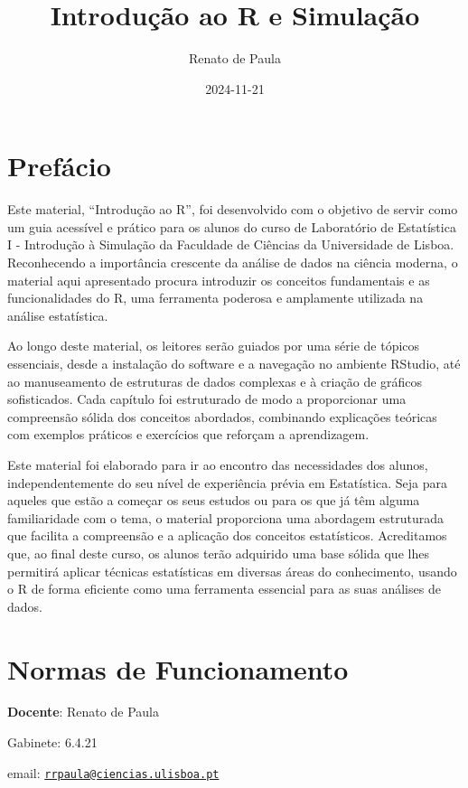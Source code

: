 \documentclass[
]{book}
\title{Introdução ao R e Simulação}
\author{Renato de Paula}
\date{2024-11-21}
\begin{document}
\maketitle

{
\setcounter{tocdepth}{1}
\tableofcontents
}
\chapter{Prefácio}\label{prefuxe1cio}

Este material, ``Introdução ao R'', foi desenvolvido com o objetivo de servir como um guia acessível e prático para os alunos do curso de Laboratório de Estatística I - Introdução à Simulação da Faculdade de Ciências da Universidade de Lisboa. Reconhecendo a importância crescente da análise de dados na ciência moderna, o material aqui apresentado procura introduzir os conceitos fundamentais e as funcionalidades do R, uma ferramenta poderosa e amplamente utilizada na análise estatística.

Ao longo deste material, os leitores serão guiados por uma série de tópicos essenciais, desde a instalação do software e a navegação no ambiente RStudio, até ao manuseamento de estruturas de dados complexas e à criação de gráficos sofisticados. Cada capítulo foi estruturado de modo a proporcionar uma compreensão sólida dos conceitos abordados, combinando explicações teóricas com exemplos práticos e exercícios que reforçam a aprendizagem.

Este material foi elaborado para ir ao encontro das necessidades dos alunos, independentemente do seu nível de experiência prévia em Estatística. Seja para aqueles que estão a começar os seus estudos ou para os que já têm alguma familiaridade com o tema, o material proporciona uma abordagem estruturada que facilita a compreensão e a aplicação dos conceitos estatísticos. Acreditamos que, ao final deste curso, os alunos terão adquirido uma base sólida que lhes permitirá aplicar técnicas estatísticas em diversas áreas do conhecimento, usando o R de forma eficiente como uma ferramenta essencial para as suas análises de dados.

\chapter{Normas de Funcionamento}\label{normas-de-funcionamento}

\textbf{Docente}: Renato de Paula

Gabinete: 6.4.21

email:
\href{mailto:rrpaula@ciencias.ulisboa.pt}{\nolinkurl{rrpaula@ciencias.ulisboa.pt}}
\end{document}
